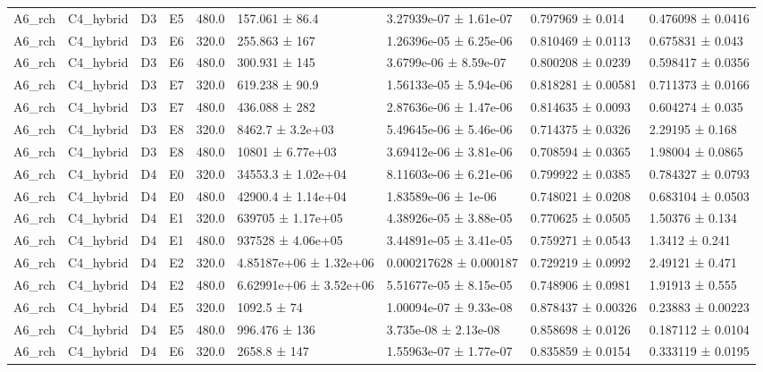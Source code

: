 \begin{table}
\begin{tabular}{lllllllll}
A6\_rch & C4\_hybrid & D3 & E5 & 480.0 & 157.061 ± 86.4 & 3.27939e-07 ± 1.61e-07 & 0.797969 ± 0.014 & 0.476098 ± 0.0416 \\
A6\_rch & C4\_hybrid & D3 & E6 & 320.0 & 255.863 ± 167 & 1.26396e-05 ± 6.25e-06 & 0.810469 ± 0.0113 & 0.675831 ± 0.043 \\
A6\_rch & C4\_hybrid & D3 & E6 & 480.0 & 300.931 ± 145 & 3.6799e-06 ± 8.59e-07 & 0.800208 ± 0.0239 & 0.598417 ± 0.0356 \\
A6\_rch & C4\_hybrid & D3 & E7 & 320.0 & 619.238 ± 90.9 & 1.56133e-05 ± 5.94e-06 & 0.818281 ± 0.00581 & 0.711373 ± 0.0166 \\
A6\_rch & C4\_hybrid & D3 & E7 & 480.0 & 436.088 ± 282 & 2.87636e-06 ± 1.47e-06 & 0.814635 ± 0.0093 & 0.604274 ± 0.035 \\
A6\_rch & C4\_hybrid & D3 & E8 & 320.0 & 8462.7 ± 3.2e+03 & 5.49645e-06 ± 5.46e-06 & 0.714375 ± 0.0326 & 2.29195 ± 0.168 \\
A6\_rch & C4\_hybrid & D3 & E8 & 480.0 & 10801 ± 6.77e+03 & 3.69412e-06 ± 3.81e-06 & 0.708594 ± 0.0365 & 1.98004 ± 0.0865 \\
A6\_rch & C4\_hybrid & D4 & E0 & 320.0 & 34553.3 ± 1.02e+04 & 8.11603e-06 ± 6.21e-06 & 0.799922 ± 0.0385 & 0.784327 ± 0.0793 \\
A6\_rch & C4\_hybrid & D4 & E0 & 480.0 & 42900.4 ± 1.14e+04 & 1.83589e-06 ± 1e-06 & 0.748021 ± 0.0208 & 0.683104 ± 0.0503 \\
A6\_rch & C4\_hybrid & D4 & E1 & 320.0 & 639705 ± 1.17e+05 & 4.38926e-05 ± 3.88e-05 & 0.770625 ± 0.0505 & 1.50376 ± 0.134 \\
A6\_rch & C4\_hybrid & D4 & E1 & 480.0 & 937528 ± 4.06e+05 & 3.44891e-05 ± 3.41e-05 & 0.759271 ± 0.0543 & 1.3412 ± 0.241 \\
A6\_rch & C4\_hybrid & D4 & E2 & 320.0 & 4.85187e+06 ± 1.32e+06 & 0.000217628 ± 0.000187 & 0.729219 ± 0.0992 & 2.49121 ± 0.471 \\
A6\_rch & C4\_hybrid & D4 & E2 & 480.0 & 6.62991e+06 ± 3.52e+06 & 5.51677e-05 ± 8.15e-05 & 0.748906 ± 0.0981 & 1.91913 ± 0.555 \\
A6\_rch & C4\_hybrid & D4 & E5 & 320.0 & 1092.5 ± 74 & 1.00094e-07 ± 9.33e-08 & 0.878437 ± 0.00326 & 0.23883 ± 0.00223 \\
A6\_rch & C4\_hybrid & D4 & E5 & 480.0 & 996.476 ± 136 & 3.735e-08 ± 2.13e-08 & 0.858698 ± 0.0126 & 0.187112 ± 0.0104 \\
A6\_rch & C4\_hybrid & D4 & E6 & 320.0 & 2658.8 ± 147 & 1.55963e-07 ± 1.77e-07 & 0.835859 ± 0.0154 & 0.333119 ± 0.0195 \\

\end{tabular}
\end{table}
